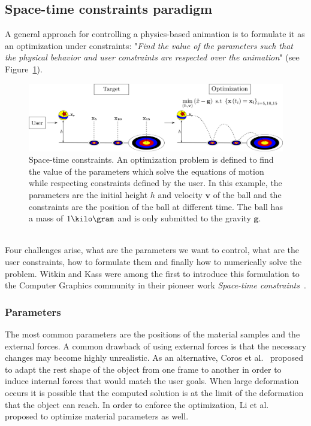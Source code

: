 \subsection{Space-time constraints paradigm}
A general approach for controlling a physics-based animation is to formulate it as an optimization under constraints: 
"\emph{Find the value of the parameters such that the physical behavior and user constraints are respected over the animation}" 
(see Figure~\ref{fig:spaceTimeConstraints}).
\begin{figure}[!h]
\centering
\includegraphics[width=\linewidth]{./images/simulationControl/spaceTimeConstraints.png}
\caption[STAR control: Space-time constraints]{\label{fig:spaceTimeConstraints} Space-time constraints. 
An optimization problem is defined to find the value of the parameters which solve the equations of motion while respecting constraints defined by the user.
In this example, the parameters are the initial height $h$ and velocity $\mathbf{v}$ of the ball and the constraints are the position of the ball at different time.
The ball has a mass of $1\kilo\gram$ and is only submitted to the gravity $\mathbf{g}$.}
\end{figure}
\\
Four challenges arise, what are the parameters we want to control, what are the user constraints, how to formulate them and finally how to numerically solve the problem. 
Witkin and Kass were among the first to introduce this formulation to the Computer Graphics community in their pioneer work \emph{Space-time constraints}~\cite{Witkin1988}.

\subsubsection{Parameters}
The most common parameters are the positions of the material samples and the external forces.
A common drawback of using external forces is that the necessary changes may become highly unrealistic.
As an alternative, Coros et al.~\cite{Coros2012} proposed to adapt the rest shape of the object from one frame to another in order to induce internal forces that would match the user goals.
When large deformation occurs it is possible that the computed solution is at the limit of the deformation that the object can reach. In order to enforce the optimization, Li et al.~\cite{Li2014} proposed to optimize material parameters as well. 

